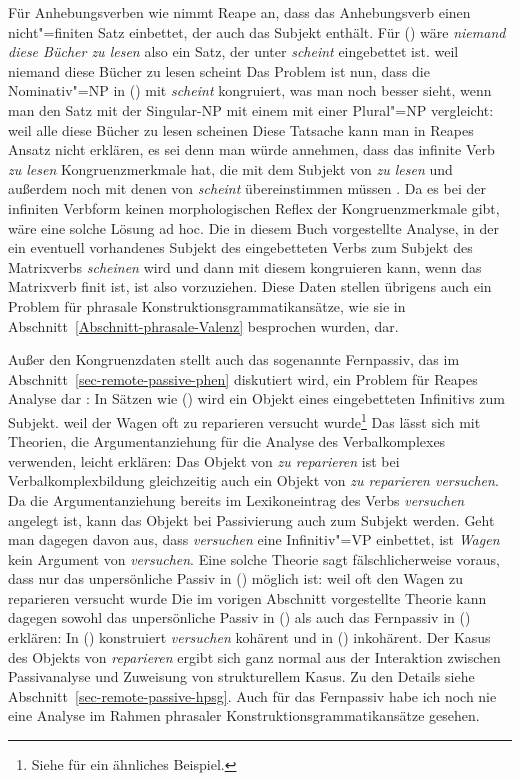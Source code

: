 {Für Anhebungsverben wie  nimmt Reape an, dass das Anhebungsverb einen nicht"=finiten
Satz einbettet, der auch das Subjekt enthält. Für () wäre
\emph{niemand diese Bücher zu lesen} also ein Satz, der unter  \emph{scheint} eingebettet ist.
\ea
weil niemand diese Bücher zu lesen scheint
\z
Das Problem ist nun, dass die Nominativ"=NP in () mit \emph{scheint} kongruiert, was man noch besser
sieht, wenn man den Satz mit der Singular-NP mit einem mit einer Plural"=NP vergleicht:
\ea
weil alle diese Bücher zu lesen scheinen
\z
Diese Tatsache kann man in Reapes Ansatz nicht erklären, es sei denn man würde
annehmen, dass das infinite Verb \emph{zu lesen} Kongruenzmerkmale hat, die mit dem
Subjekt von \emph{zu lesen} und außerdem noch mit denen von \emph{scheint} übereinstimmen
müssen \parencites[Abschnitt~5.1]{Kathol98b}[Abschnitt~21.1]{Mueller99a}. 
Da es bei der infiniten Verbform keinen morphologischen Reflex der Kongruenzmerkmale
gibt, wäre eine solche Lösung ad hoc. Die in diesem Buch vorgestellte Analyse, in der
ein eventuell vorhandenes Subjekt des eingebetteten Verbs zum Subjekt des Matrixverbs \emph{scheinen}
wird und dann mit diesem kongruieren kann, wenn das Matrixverb finit ist, ist also
vorzuziehen. Diese Daten stellen übrigens auch ein Problem für phrasale
Konstruktionsgrammatikansätze, wie sie in
Abschnitt~\ref{Abschnitt-phrasale-Valenz} besprochen wurden, dar.

Außer den Kongruenzdaten stellt auch das sogenannte Fernpassiv, das im Abschnitt~\ref{sec-remote-passive-phen}
diskutiert wird, ein Problem für Reapes Analyse dar \citep[Abschnitt~5.2]{Kathol98b}: In
Sätzen wie () wird ein Objekt eines eingebetteten Infinitivs zum Subjekt.
\ea
weil der Wagen oft zu reparieren versucht wurde\footnote{
  Siehe  für ein ähnliches Beispiel.
}
\z
Das lässt sich mit Theorien, die Argumentanziehung für die Analyse des Verbalkomplexes verwenden,
leicht erklären: Das Objekt von \emph{zu reparieren} ist bei Verbalkomplexbildung gleichzeitig
auch ein Objekt von \emph{zu reparieren versuchen}. Da die Argumentanziehung bereits im Lexikoneintrag
des Verbs \emph{versuchen} angelegt ist, kann das Objekt bei Passivierung auch zum Subjekt werden.
Geht man dagegen davon aus, dass \emph{versuchen} eine Infinitiv"=VP einbettet, ist \emph{Wagen}
kein Argument von \emph{versuchen}. Eine solche Theorie sagt fälschlicherweise voraus, dass nur das unpersönliche
Passiv in () möglich ist:
\ea
weil oft den Wagen zu reparieren versucht wurde
\z
Die im vorigen Abschnitt vorgestellte Theorie kann dagegen sowohl das unpersönliche Passiv
in () als auch das Fernpassiv in () erklären: In () konstruiert
\emph{versuchen} kohärent und in () inkohärent. Der Kasus des Objekts von \emph{reparieren}
ergibt sich ganz normal aus der Interaktion zwischen Passivanalyse und Zuweisung von strukturellem
Kasus. Zu den Details siehe Abschnitt~\ref{sec-remote-passive-hpsg}.
Auch für das Fernpassiv habe ich noch nie eine Analyse im Rahmen phrasaler
Konstruktionsgrammatikansätze gesehen.%

}
